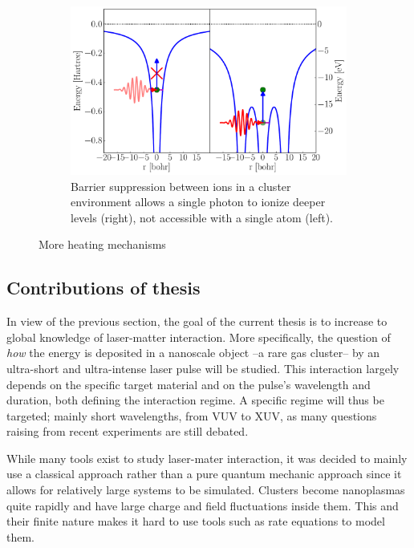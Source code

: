 \begin{figure}
    \begin{subfigure}{\figurewidth}
        \centering
        \includegraphics[width=\textwidth]{figures/heating_barrier_sup}
        \caption{Barrier suppression between ions in a cluster environment allows
                 a single photon to ionize deeper levels (right), not accessible
                 with a single atom (left).}
        \label{fig:heating:barrier}
    \end{subfigure}
 \caption{More heating mechanisms}
 \label{fig:heating}
\end{figure}



\clearpage
\subsection{Contributions of thesis}

In view of the previous section, the goal of the current thesis is
to increase to global knowledge of laser-matter interaction.
More specifically, the
question of \textit{how} the energy is deposited in a nanoscale object
--a rare gas cluster-- by an
ultra-short and ultra-intense laser pulse will be studied. This interaction
largely depends on the specific target material and on the pulse's wavelength
and duration, both defining the interaction regime. A specific regime will
thus be targeted; mainly short wavelengths, from VUV to XUV, as many questions
raising from recent experiments are still debated.

While many tools exist to study laser-mater interaction, it was decided to
mainly use a classical approach rather than a pure quantum mechanic approach
since it allows for relatively large systems to be simulated. Clusters become
nanoplasmas quite rapidly and have large charge and field fluctuations inside
them. This and their finite nature makes it hard to use tools such as rate
equations to model them.


